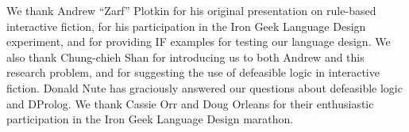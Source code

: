 We thank Andrew ``Zarf'' Plotkin for his original presentation on
rule-based interactive fiction, for his participation in the Iron Geek
Language Design experiment, and for providing IF examples for testing
our language design.
%
We also thank Chung-chieh Shan for introducing us to both Andrew and
this research problem, and for suggesting the use of defeasible logic
in interactive fiction.
%
Donald Nute has graciously answered our questions about defeasible
logic and DProlog.
% 
We thank Cassie Orr and Doug Orleans for their enthusiastic
participation in the Iron Geek Language Design marathon.
